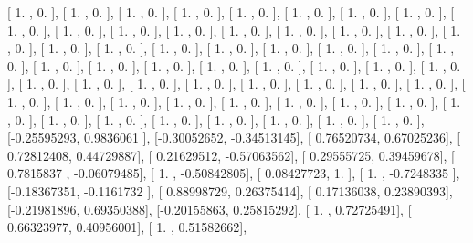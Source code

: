 \documentclass{article}
\begin{document}
       [ 1.        ,  0.        ],
       [ 1.        ,  0.        ],
       [ 1.        ,  0.        ],
       [ 1.        ,  0.        ],
       [ 1.        ,  0.        ],
       [ 1.        ,  0.        ],
       [ 1.        ,  0.        ],
       [ 1.        ,  0.        ],
       [ 1.        ,  0.        ],
       [ 1.        ,  0.        ],
       [ 1.        ,  0.        ],
       [ 1.        ,  0.        ],
       [ 1.        ,  0.        ],
       [ 1.        ,  0.        ],
       [ 1.        ,  0.        ],
       [ 1.        ,  0.        ],
       [ 1.        ,  0.        ],
       [ 1.        ,  0.        ],
       [ 1.        ,  0.        ],
       [ 1.        ,  0.        ],
       [ 1.        ,  0.        ],
       [ 1.        ,  0.        ],
       [ 1.        ,  0.        ],
       [ 1.        ,  0.        ],
       [ 1.        ,  0.        ],
       [ 1.        ,  0.        ],
       [ 1.        ,  0.        ],
       [ 1.        ,  0.        ],
       [ 1.        ,  0.        ],
       [ 1.        ,  0.        ],
       [ 1.        ,  0.        ],
       [ 1.        ,  0.        ],
       [ 1.        ,  0.        ],
       [ 1.        ,  0.        ],
       [ 1.        ,  0.        ],
       [ 1.        ,  0.        ],
       [ 1.        ,  0.        ],
       [ 1.        ,  0.        ],
       [ 1.        ,  0.        ],
       [ 1.        ,  0.        ],
       [ 1.        ,  0.        ],
       [ 1.        ,  0.        ],
       [ 1.        ,  0.        ],
       [ 1.        ,  0.        ],
       [ 1.        ,  0.        ],
       [ 1.        ,  0.        ],
       [ 1.        ,  0.        ],
       [ 1.        ,  0.        ],
       [ 1.        ,  0.        ],
       [ 1.        ,  0.        ],
       [ 1.        ,  0.        ],
       [ 1.        ,  0.        ],
       [ 1.        ,  0.        ],
       [ 1.        ,  0.        ],
       [ 1.        ,  0.        ],
       [ 1.        ,  0.        ],
       [ 1.        ,  0.        ],
       [-0.25595293,  0.9836061 ],
       [-0.30052652, -0.34513145],
       [ 0.76520734,  0.67025236],
       [ 0.72812408,  0.44729887],
       [ 0.21629512, -0.57063562],
       [ 0.29555725,  0.39459678],
       [ 0.7815837 , -0.06079485],
       [ 1.        , -0.50842805],
       [ 0.08427723,  1.        ],
       [ 1.        , -0.7248335 ],
       [-0.18367351, -0.1161732 ],
       [ 0.88998729,  0.26375414],
       [ 0.17136038,  0.23890393],
       [-0.21981896,  0.69350388],
       [-0.20155863,  0.25815292],
       [ 1.        ,  0.72725491],
       [ 0.66323977,  0.40956001],
       [ 1.        ,  0.51582662],
\end{document}
